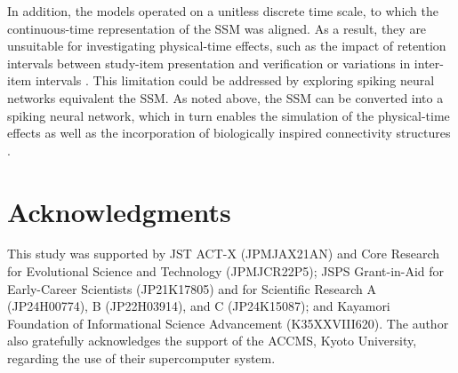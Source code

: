 \documentclass[10pt,letterpaper]{article}
\begin{document}
In addition, the models operated on a unitless discrete time scale, to which the continuous-time representation of the SSM was aligned.
As a result, they are unsuitable for investigating physical-time effects, such as the impact of retention intervals between study-item presentation and verification \citep[][]{CornellBergstrom83,Wright+85,Neath93} or variations in inter-item intervals \citep{NeathKnoedler94}.
This limitation could be addressed by exploring spiking neural networks equivalent the SSM.
As noted above, the SSM can be converted into a spiking neural network, which in turn enables the simulation of the physical-time effects as well as the incorporation of biologically inspired connectivity structures
\citep{VoelkerEliasmith18}.




\section*{Acknowledgments}
This study was supported by 
JST ACT-X (JPMJAX21AN) and Core Research for Evolutional Science and Technology (JPMJCR22P5);
JSPS Grant-in-Aid for Early-Career Scientists (JP21K17805) 
and for Scientific Research
A (JP24H00774),
B (JP22H03914),
and C (JP24K15087);
and Kayamori Foundation of Informational Science Advancement (K35XXVIII620).
The author also gratefully acknowledges the support of the
ACCMS, Kyoto University,
regarding the use of their supercomputer system.


\newpage




% 


\appendix
\end{document}
